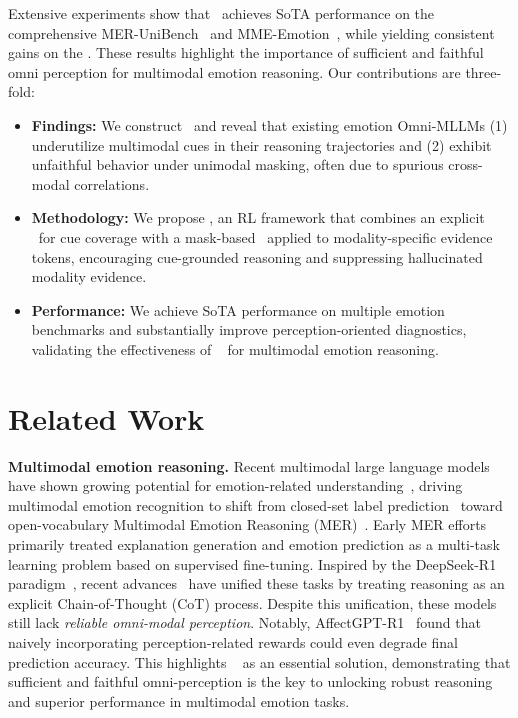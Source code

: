 \documentclass{article}
\theoremstyle{plain}
\theoremstyle{definition}
\theoremstyle{remark}
\begin{document}
Extensive experiments show that \ourmethod~achieves SoTA performance on the comprehensive MER-UniBench~\cite{lian2025affectgpt} and MME-Emotion~\cite{zhang2025mme}, while yielding consistent gains on the \ourbench. These results highlight the importance of sufficient and faithful omni perception for multimodal emotion reasoning. Our contributions are three-fold:
\begin{itemize}
    \item \textbf{Findings:} We construct  \ourbench~and reveal that existing emotion Omni-MLLMs (1) underutilize multimodal cues in their reasoning trajectories and  (2) exhibit unfaithful behavior under unimodal masking, often due to spurious cross-modal correlations.
    \item \textbf{Methodology:} We propose \ourmethod, an RL framework that combines an explicit \ourreward~for cue coverage with a mask-based \ourloss~applied to modality-specific evidence tokens, encouraging cue-grounded reasoning and suppressing hallucinated modality evidence.
    \item \textbf{Performance:} We achieve SoTA performance on multiple emotion benchmarks and substantially improve perception-oriented diagnostics, validating the effectiveness of \ourmethod~ for multimodal emotion reasoning.
\end{itemize}


\section{Related Work}
\label{sec:relatedwork}

\noindent \textbf{Multimodal emotion reasoning.} Recent multimodal large language models~\cite{wang2026affordbot,wang2025augrefer} have shown growing potential for emotion-related understanding~\cite{xu2026social,dai2025psyche,zhang2026stimuli,song2024emotional,ye2025multi}, driving multimodal emotion recognition to shift from closed-set label prediction~\cite{lian2023mer, jiang2020dfew, liu2022mafw} toward open-vocabulary Multimodal Emotion Reasoning (MER)~\cite{lian2023explainable, lian2025affectgpt}. Early MER efforts~\cite{lian2023explainable, cheng2024emotion, han2025benchmarking, lian2025affectgpt} primarily treated explanation generation and emotion prediction as a multi-task learning problem based on supervised fine-tuning. Inspired by the DeepSeek-R1 paradigm~\cite{guo2025deepseek}, recent advances~\cite{lian2025affectgptr1, yang2025humanomniv2, zhao2025r1} have unified these tasks by treating reasoning as an explicit Chain-of-Thought (CoT) process. Despite this unification, these models still lack \textit{reliable omni-modal perception}. Notably, AffectGPT-R1~\cite{lian2025affectgptr1} found that naively incorporating perception-related rewards could even degrade final prediction accuracy. This highlights \ourmethod~ as an essential solution, demonstrating that sufficient and faithful omni-perception is the key to unlocking robust reasoning and superior performance in multimodal emotion tasks.
\end{document}

